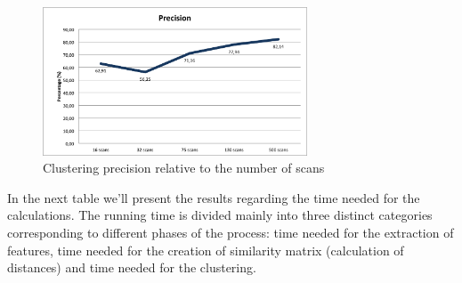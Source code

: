 \begin{figure}[!htbp]
\centering
\includegraphics[width=0.7\textwidth]{images/precisione.png}
\caption{Clustering precision relative to the number of scans}
\label{fig:precision}
\end{figure}

In the next table we'll present the results regarding the time needed for the calculations. The running time is divided mainly into three distinct categories corresponding to different phases of the process: time needed for the extraction of features, time needed for the creation of similarity matrix (calculation of distances) and time needed for the clustering.

